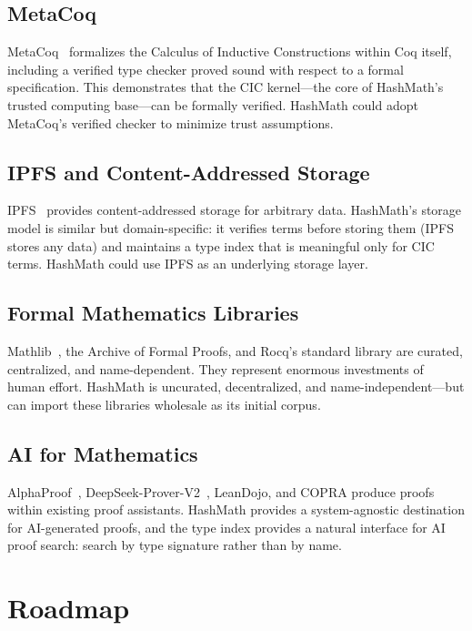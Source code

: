 \documentclass[11pt]{article}
\theoremstyle{definition}
\theoremstyle{plain}
\theoremstyle{remark}
\begin{document}
\subsection{MetaCoq}

MetaCoq~\cite{metacoq} formalizes the Calculus of Inductive Constructions within Coq itself,
including a verified type checker proved sound with respect to a formal specification.
This demonstrates that the CIC kernel---the core of HashMath's trusted computing base---can
be formally verified.
HashMath could adopt MetaCoq's verified checker to minimize trust assumptions.

\subsection{IPFS and Content-Addressed Storage}

IPFS~\cite{ipfs} provides content-addressed storage for arbitrary data.
HashMath's storage model is similar but domain-specific: it verifies terms before storing them
(IPFS stores any data) and maintains a type index that is meaningful only for CIC terms.
HashMath could use IPFS as an underlying storage layer.

\subsection{Formal Mathematics Libraries}

Mathlib~\cite{mathlib}, the Archive of Formal Proofs, and Rocq's standard library are curated,
centralized, and name-dependent.
They represent enormous investments of human effort.
HashMath is uncurated, decentralized, and name-independent---but can import these libraries
wholesale as its initial corpus.

\subsection{AI for Mathematics}

AlphaProof~\cite{alphaproof}, DeepSeek-Prover-V2~\cite{deepseek}, LeanDojo, and COPRA
produce proofs within existing proof assistants.
HashMath provides a system-agnostic destination for AI-generated proofs, and the type index
provides a natural interface for AI proof search: search by type signature rather than by name.


\section{Roadmap}
\label{sec:roadmap}
\end{document}
